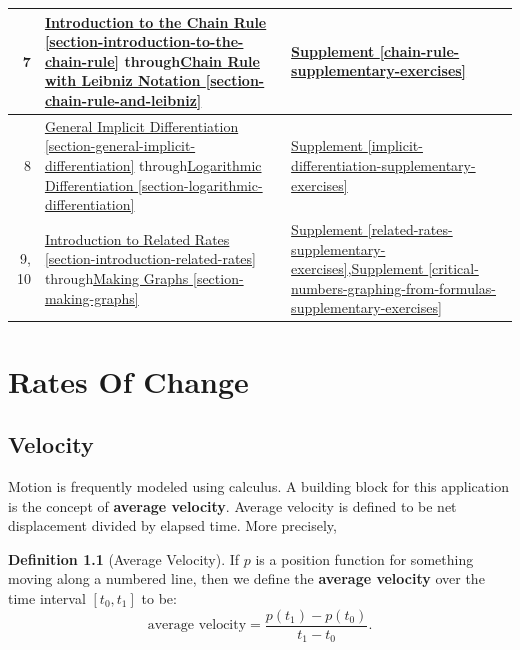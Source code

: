 \documentclass[10pt,oneside,]{book}
\newcommand{\terminology}[1]{\textbf{#1}}
\theoremstyle{plain}
\theoremstyle{definition}
\newtheorem{definition}[theorem]{Definition}
\numberwithin{equation}{section}
\newcommand{\fe}[2]{#1\mathopen{}\left(#2\right)\mathclose{}}
\newcommand{\cinterval}[2]{\left[#1,#2\right]}
\begin{document}
\begin{tabular}{rp{3in}p{1.1in}}
\midrule
7&\hyperref[section-introduction-to-the-chain-rule]{Introduction to the Chain Rule \ref{section-introduction-to-the-chain-rule}} through\newline{}\hyperref[section-chain-rule-and-leibniz]{Chain Rule with Leibniz Notation \ref{section-chain-rule-and-leibniz}}&\hyperref[chain-rule-supplementary-exercises]{Supplement \ref{chain-rule-supplementary-exercises}}\\
\midrule
8&\hyperref[section-general-implicit-differentiation]{General Implicit Differentiation \ref{section-general-implicit-differentiation}} through\newline{}\hyperref[section-logarithmic-differentiation]{Logarithmic Differentiation \ref{section-logarithmic-differentiation}}&\hyperref[implicit-differentiation-supplementary-exercises]{Supplement \ref{implicit-differentiation-supplementary-exercises}}\\
\midrule
9, 10&\hyperref[section-introduction-related-rates]{Introduction to Related Rates \ref{section-introduction-related-rates}} through\newline{}\hyperref[section-making-graphs]{Making Graphs \ref{section-making-graphs}}&\hyperref[related-rates-supplementary-exercises]{Supplement \ref{related-rates-supplementary-exercises}},\newline{}\hyperref[critical-numbers-graphing-from-formulas-supplementary-exercises]{Supplement \ref{critical-numbers-graphing-from-formulas-supplementary-exercises}}\\
\bottomrule
\end{tabular}
\setcounter{tocdepth}{1}
\renewcommand*\contentsname{Contents}
\tableofcontents
\mainmatter
\typeout{************************************************}
\typeout{************************************************}
\chapter[Rates Of Change]{Rates Of Change}\label{chapter-rates-of-change}
\typeout{************************************************}
\typeout{************************************************}
\section[Velocity]{Velocity}\label{section-velocity}
Motion is frequently modeled using calculus. A building block for this application is the concept of \terminology{average velocity}. Average velocity is defined to be net displacement divided by elapsed time.  More precisely,%
\begin{definition}[Average Velocity]\label{definition-average-velocity}
If \(p\) is a position function for something moving along a numbered line, then we define the \terminology{average velocity} over the time interval \(\cinterval{t_0}{t_1}\) to be: \[\text{average velocity}=\frac{\fe{p}{t_1}-\fe{p}{t_0}}{t_1-t_0}\text{.}\]%
\end{definition}
\typeout{************************************************}
\typeout{************************************************}
\end{document}
